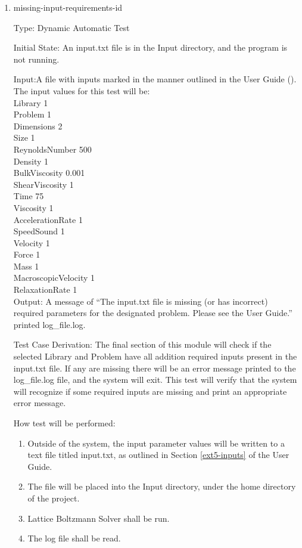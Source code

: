 \documentclass[12pt, titlepage]{article}
\newcommand{\myprogname}{Lattice Boltzmann Solver}
\newcounter{uvtestcounter} %
\begin{document}
\begin{enumerate}
	\item{missing-input-requirements-id\theuvtestcounter\\}
	
Type: Dynamic Automatic Test

Initial State: An input.txt file is in the Input directory, and the program is not running.

Input:A file with inputs marked in the manner outlined in the
User Guide (\citet{LBM_UserGuide_PM}).\\The input values for this test will
be:\\

Library 1\\
Problem 1\\
Dimensions 2\\
Size 1\\
ReynoldsNumber 500\\
Density 1\\
BulkViscosity 0.001\\
ShearViscosity 1\\
Time 75\\
Viscosity 1\\
AccelerationRate 1\\
SpeedSound 1\\
Velocity 1\\
Force 1\\
Mass 1\\
MacroscopicVelocity 1\\
RelaxationRate 1\\

Output: A message of ``The input.txt file is missing (or has incorrect) required parameters for the designated problem. Please see the User Guide.'' printed log\_file.log.

Test Case Derivation: The final section of this module will check if the selected Library and Problem have all addition required inputs present in the input.txt file. If any are missing there will be an error message printed to the log\_file.log file, and the system will exit. This test will verify that the system will recognize if some required inputs are missing and print an appropriate error message.

How test will be performed: 
\begin{enumerate}
	\item Outside of the system, the input parameter values will be written to a text file titled input.txt, as outlined in Section \ref{ext5-inputs} of the User Guide.
	\item The file will be placed into the Input directory, under the home directory of the project.
	\item {\myprogname} shall be run. 
	\item The log file shall be read.
\end{enumerate}



\end{enumerate}
\end{document}
